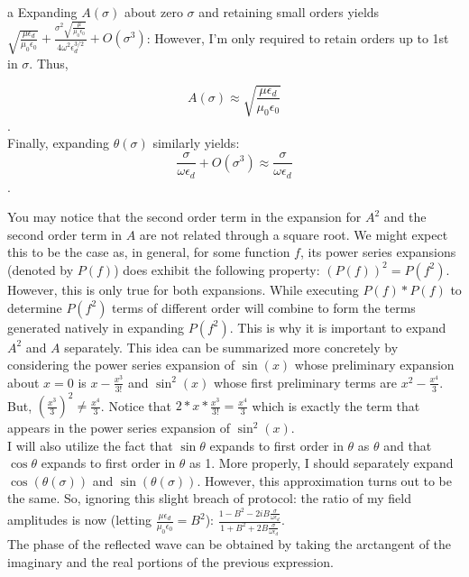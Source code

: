 \begin{homeworkProblem}
\begin{homeworkSection}{a}
Expanding $A(\sigma)$ about zero $\sigma$ and retaining small orders yields $\sqrt{\frac{\mu  \epsilon _d}{\mu _0 \epsilon _0}}+\frac{\sigma ^2 \sqrt{\frac{\mu }{\mu _0 \epsilon _0}}}{4 \omega ^2
   \epsilon _d^{3/2}}+O\left(\sigma ^3\right)$: However, I'm only required to retain orders up to 1st in $\sigma$. Thus, 
	
	\[ A(\sigma) \approx \sqrt{\frac{\mu  \epsilon_{d}}{\mu _0 \epsilon _0}} \].
	\\
		
Finally, expanding $\theta(\sigma)$ similarly yields: \[\frac{\sigma }{\omega \epsilon_{d}}+O\left(\sigma ^3\right)\approx \frac{\sigma}{\omega \epsilon_{d}} \].

	You may notice that the second order term in the expansion for $A^2$ and the second order term in $A$ are not related through a square root. We might expect this to be the case as, in general, for some function $f$, its power series expansions (denoted by $P(f)$) does exhibit the following property: $(P(f))^2 =P(f^2)$. However, this is only true for both expansions. While executing $P(f)*P(f)$ to determine $P(f^2)$ terms of different order will combine to form the terms generated natively in expanding $P(f^2)$. This is why it is important to expand $A^2$ and $A$ separately. This idea can be summarized more concretely by considering the power series expansion of $\sin(x)$ whose preliminary expansion about $x=0$ is $x-\frac{x^3}{3!}$ and $\sin^2(x)$ whose first preliminary terms are $x^2-\frac{x^4}{3}$. But, $(\frac{x^3}{3})^2 \ne \frac{x^4}{3}$. Notice that $2*x*\frac{x^3}{3!} = \frac{x^4}{3}$ which is exactly the term that appears in the power series expansion of $\sin^2(x)$.
	\\

I will also utilize the fact that $\sin\theta$ expands to first order in $\theta$ as $\theta$ and that $\cos\theta$ expands to first order in $\theta$ as 1. More properly, I should separately expand $\cos(\theta(\sigma))$ and $\sin(\theta(\sigma))$. However, this approximation turns out to be the same. So, ignoring this slight breach of protocol: the ratio of my field amplitudes is now (letting $\frac{\mu\epsilon_d}{\mu_0 \epsilon_0} = B^2$): $\frac{1 - B^2 - 2i B \frac{\sigma}{\omega \epsilon_d}}{1 + B^2 + 2 B \frac{\sigma}{\omega \epsilon_d}}$.
\\

The phase of the reflected wave can be obtained by taking the arctangent of the imaginary and the real portions of the previous expression.
\\


\end{homeworkSection}
\end{homeworkProblem}
